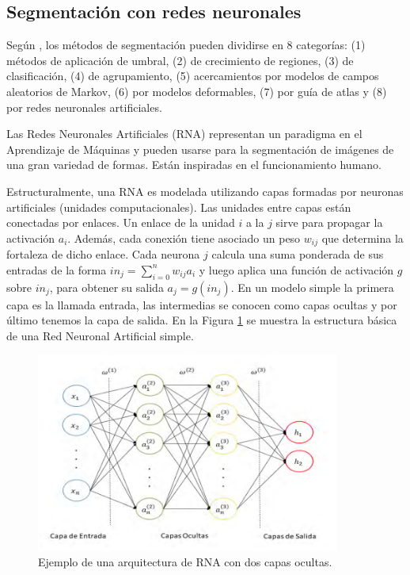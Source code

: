 \subsection{Segmentación con redes neuronales}

Según \cite{pham2000survey}, los métodos de segmentación pueden dividirse en 8 categorías: (1) métodos de aplicación de umbral, (2) de crecimiento de regiones, (3) de clasificación, (4) de agrupamiento, (5) acercamientos por modelos de campos aleatorios de Markov, (6) por modelos deformables, (7) por guía de atlas y (8) por redes neuronales artificiales.

Las Redes Neuronales Artificiales (RNA) representan un paradigma en el Aprendizaje de Máquinas y pueden usarse para la segmentación de imágenes de una gran variedad de formas. Están inspiradas en el funcionamiento humano.

Estructuralmente, una RNA es modelada utilizando capas formadas por neuronas artificiales (unidades computacionales). Las unidades entre capas están conectadas por enlaces. Un enlace de la unidad $i$ a la $j$ sirve para propagar la activación $a_i$. Además, cada conexión tiene asociado un peso $w_{ij}$ que determina la fortaleza de dicho enlace. Cada neurona $j$ calcula una suma ponderada de sus entradas de la forma $in_j = \sum_{i = 0}^{n} w_{ij}a_i$ y luego aplica una función de activación $g$ sobre $in_j$, para obtener su salida $a_j = g(in_j)$. En un modelo simple la primera capa es la llamada entrada, las intermedias se conocen como capas ocultas y por último tenemos la capa de salida. En la Figura \ref{fig:rna} se muestra la estructura básica de una Red Neuronal Artificial simple.

\begin{figure}[ht]
	\centering
	\includegraphics[width=10cm]{./Graphics/rna.png}
	\caption{Ejemplo de una arquitectura de RNA con dos capas ocultas.}
	\label{fig:rna}
\end{figure}

